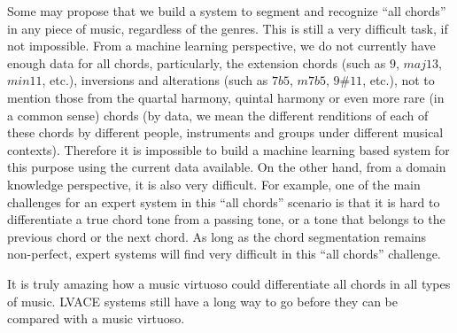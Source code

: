 Some may propose that we build a system to segment and recognize ``all chords'' in any piece of music, regardless of the genres. This is still a very difficult task, if not impossible. From a machine learning perspective, we do not currently have enough data for all chords, particularly, the extension chords (such as $9$, $maj13$, $min11$, etc.), inversions and alterations (such as $7b5$, $m7b5$, $9\#11$, etc.), not to mention those from the quartal harmony, quintal harmony or even more rare (in a common sense) chords (by data, we mean the different renditions of each of these chords by different people, instruments and groups under different musical contexts). Therefore it is impossible to build a machine learning based system for this purpose using the current data available. On the other hand, from a domain knowledge perspective, it is also very difficult. For example, one of the main challenges for an expert system in this ``all chords'' scenario is that it is hard to differentiate a true chord tone from a passing tone, or a tone that belongs to the previous chord or the next chord. As long as the chord segmentation remains non-perfect, expert systems will find very difficult in this ``all chords'' challenge.

It is truly amazing how a music virtuoso could differentiate all chords in all types of music. LVACE systems still have a long way to go before they can be compared with a music virtuoso.


